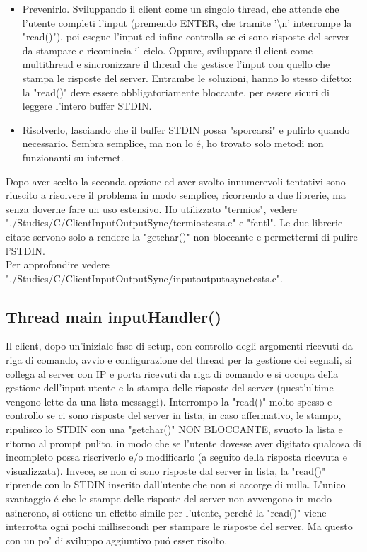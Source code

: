 \begin{itemize}
	\item Prevenirlo. Sviluppando il client come un singolo thread, che attende che l'utente completi l'input (premendo ENTER, che tramite '\textbackslash n' interrompe la "read()"), poi esegue l'input ed infine controlla se ci sono risposte del server da stampare e ricomincia il ciclo. Oppure, sviluppare il client come multithread e sincronizzare il thread che gestisce l'input con quello che stampa le risposte del server. Entrambe le soluzioni, hanno lo stesso difetto: la "read()" deve essere obbligatoriamente bloccante, per essere sicuri di leggere l'intero buffer STDIN.
	\item Risolverlo, lasciando che il buffer STDIN possa "sporcarsi" e pulirlo quando necessario. Sembra semplice, ma non lo \'e, ho trovato solo metodi non funzionanti su internet. 
\end{itemize}
\leavevmode
Dopo aver scelto la seconda opzione ed aver svolto innumerevoli tentativi sono riuscito a risolvere il problema in modo semplice, ricorrendo a due librerie, ma senza doverne fare un uso estensivo. Ho utilizzato "termios", vedere "./Studies/C/ClientInputOutputSync/termiostests.c" e "fcntl". Le due librerie citate servono solo a rendere la "getchar()" non bloccante e permettermi di pulire l'STDIN. 
\\
Per approfondire vedere "./Studies/C/ClientInputOutputSync/inputoutputasynctests.c".

 \subsection{Thread main inputHandler()}
 Il client, dopo un'iniziale fase di setup, con controllo degli argomenti ricevuti da riga di comando, avvio e configurazione del thread per la gestione dei segnali, si collega al server con IP e porta ricevuti da riga di comando e si occupa della gestione dell'input utente e la stampa delle risposte del server (quest'ultime vengono lette da una lista messaggi). Interrompo la "read()" molto spesso e controllo se ci sono risposte del server in lista, in caso affermativo, le stampo, ripulisco lo STDIN con una "getchar()" NON BLOCCANTE, svuoto la lista e ritorno al prompt pulito, in modo che se l'utente dovesse aver digitato qualcosa di incompleto possa riscriverlo e/o modificarlo (a seguito della risposta ricevuta e visualizzata). Invece, se non ci sono risposte dal server in lista, la "read()" riprende con lo STDIN inserito dall'utente che non si accorge di nulla. L'unico svantaggio \'e che le stampe delle risposte del server non avvengono in modo asincrono, si ottiene un effetto simile per l'utente, perch\'e la "read()" viene interrotta ogni pochi millisecondi per stampare le risposte del server. Ma questo con un po' di sviluppo aggiuntivo pu\'o esser risolto.

